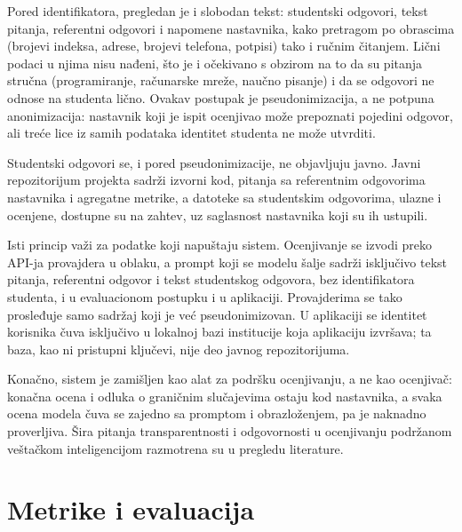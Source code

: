Pored identifikatora, pregledan je i slobodan tekst: studentski odgovori, tekst pitanja, referentni odgovori i napomene nastavnika,
kako pretragom po obrascima (brojevi indeksa, adrese, brojevi telefona, potpisi) tako i ručnim čitanjem.
Lični podaci u njima nisu nađeni,
što je i očekivano s obzirom na to da su pitanja stručna (programiranje, računarske mreže, naučno pisanje)
i da se odgovori ne odnose na studenta lično.
Ovakav postupak je pseudonimizacija, a ne potpuna anonimizacija:
nastavnik koji je ispit ocenjivao može prepoznati pojedini odgovor,
ali treće lice iz samih podataka identitet studenta ne može utvrditi.

Studentski odgovori se, i pored pseudonimizacije, ne objavljuju javno.
Javni repozitorijum projekta sadrži izvorni kod, pitanja sa referentnim odgovorima nastavnika i agregatne metrike,
a datoteke sa studentskim odgovorima, ulazne i ocenjene, dostupne su na zahtev,
uz saglasnost nastavnika koji su ih ustupili.

Isti princip važi za podatke koji napuštaju sistem.
Ocenjivanje se izvodi preko API-ja provajdera u oblaku,
a prompt koji se modelu šalje sadrži isključivo tekst pitanja, referentni odgovor i tekst studentskog odgovora,
bez identifikatora studenta, i u evaluacionom postupku i u aplikaciji.
Provajderima se tako prosleđuje samo sadržaj koji je već pseudonimizovan.
U aplikaciji se identitet korisnika čuva isključivo u lokalnoj bazi institucije koja aplikaciju izvršava;
ta baza, kao ni pristupni ključevi, nije deo javnog repozitorijuma.

Konačno, sistem je zamišljen kao alat za podršku ocenjivanju, a ne kao ocenjivač:
konačna ocena i odluka o graničnim slučajevima ostaju kod nastavnika,
a svaka ocena modela čuva se zajedno sa promptom i obrazloženjem, pa je naknadno proverljiva.
Šira pitanja transparentnosti i odgovornosti u ocenjivanju podržanom veštačkom inteligencijom razmotrena su u pregledu literature.

\section{Metrike i evaluacija}
\label{sec:metrike}

